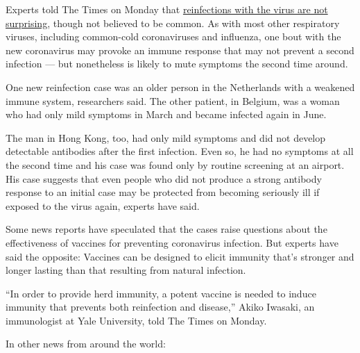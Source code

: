 Experts told The Times on Monday that
\href{https://www.nytimes3xbfgragh.onion/2020/08/24/health/coronavirus-reinfection.html}{reinfections
with the virus are not surprising}, though not believed to be common. As
with most other respiratory viruses, including common-cold coronaviruses
and influenza, one bout with the new coronavirus may provoke an immune
response that may not prevent a second infection --- but nonetheless is
likely to mute symptoms the second time around.

One new reinfection case was an older person in the Netherlands with a
weakened immune system, researchers said. The other patient, in Belgium,
was a woman who had only mild symptoms in March and became infected
again in June.

The man in Hong Kong, too, had only mild symptoms and did not develop
detectable antibodies after the first infection. Even so, he had no
symptoms at all the second time and his case was found only by routine
screening at an airport. His case suggests that even people who did not
produce a strong antibody response to an initial case may be protected
from becoming seriously ill if exposed to the virus again, experts have
said.

Some news reports have speculated that the cases raise questions about
the effectiveness of vaccines for preventing coronavirus infection. But
experts have said the opposite: Vaccines can be designed to elicit
immunity that's stronger and longer lasting than that resulting from
natural infection.

``In order to provide herd immunity, a potent vaccine is needed to
induce immunity that prevents both reinfection and disease,'' Akiko
Iwasaki, an immunologist at Yale University, told The Times on Monday.

In other news from around the world:

